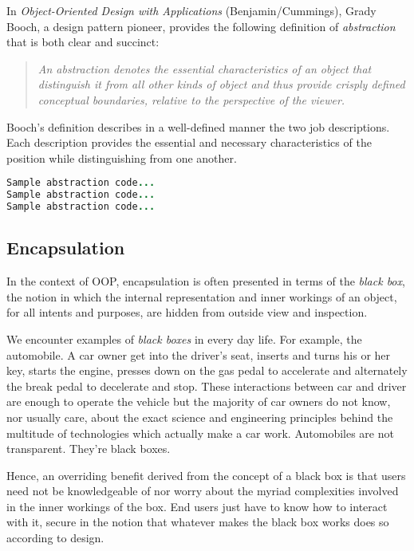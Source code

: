\documentclass[12pt]{report}
\begin{document}
\begin{doublespace}
In \textit{Object-Oriented Design with Applications} (Benjamin/Cummings), Grady Booch, a design pattern pioneer, provides the following definition of \textit{abstraction} that is both clear and succinct:
\begin{quotation}
\textit{An abstraction denotes the essential characteristics of an object that distinguish it from all other kinds of object and thus provide crisply defined conceptual boundaries, relative to the perspective of the viewer.}
\end{quotation}

Booch's definition describes in a well-defined manner the two job descriptions. Each description provides the essential and necessary characteristics of the position while distinguishing from one another.
\end{doublespace}

\begin{lstlisting}[language=Java,label=some-code,caption=FLOOD Abstraction example]
Sample abstraction code...
Sample abstraction code...
Sample abstraction code...
\end{lstlisting}

\subsection{Encapsulation}

\begin{doublespace}
In the context of OOP, encapsulation is often presented in terms of the \textit{black box}, the notion in which the internal representation and inner workings of an object, for all intents and purposes, are hidden from outside view and inspection.

We encounter examples of \textit{black boxes} in every day life. For example, the automobile. A car owner get into the driver's seat, inserts and turns his or her key, starts the engine, presses down on the gas pedal to accelerate and alternately the break pedal to decelerate and stop. These interactions between car and driver are enough to operate the vehicle but the majority of car owners do not know, nor usually care, about the exact science and engineering principles behind the multitude of technologies which actually make a car work. Automobiles are not transparent. They're black boxes.

Hence, an overriding benefit derived from the concept of a black box is that users need not be knowledgeable of nor worry about the myriad complexities involved in the inner workings of the box. End users just have to know how to interact with it,
secure in the notion that whatever makes the black box works does so according to design. 
\end{doublespace}
\end{document}
